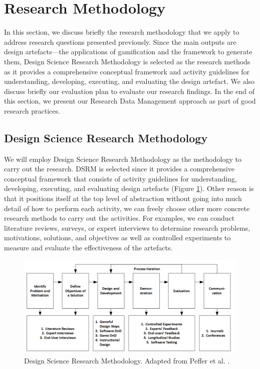 \documentclass[12pt, a4paper]{report}
\begin{document}
{\section{Research Methodology}
In this section, we discuss briefly the research methodology that we apply to address research questions presented previously. Since the main outputs are design artefacts---the applications of gamification and the framework to generate them, Design Science Research Methodology \cite{peffers2007design} is selected as the research methods as it provides a comprehensive conceptual framework and activity guidelines for understanding, developing, executing, and evaluating the design artefact. We also discuss briefly our evaluation plan to evaluate our research findings. In the end of this section, we present our Research Data Management approach as part of good research practices.   

\subsection{Design Science Research Methodology}
We will employ Design Science Research Methodology \cite{peffers2007design} as the methodology to carry out the research. DSRM is selected since it provides a comprehensive conceptual framework that consists of activity guidelines for understanding, developing, executing, and evaluating design artefacts (Figure \ref{dsrm}). Other reason is that it positions itself at the top level of abstraction without going into much detail of how to perform each activity, we can freely choose other more concrete research methods to carry out the activities. For examples, we can conduct literature reviews, surveys, or expert interviews to determine research problems, motivations, solutions, and objectives as well as controlled experiments to measure and evaluate the effectiveness of the artefacts. 

\begin{figure}[ht]
\centering
\includegraphics[width=\textwidth]{dsrm}
\caption{Design Science Research Methodology. Adapted from Peffer et al. \cite{peffers2007design}.}
\label{dsrm}
\end{figure}

}
\end{document}
